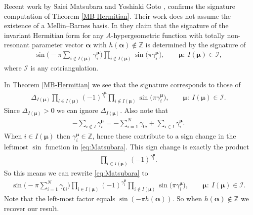 \documentclass[pdftex]{sigma}
\numberwithin{equation}{section}
\begin{document}
\begin{Remark}
Recent work by Saiei Matsubara and Yoshiaki Goto \cite[Theorem 3.3]{Mat20_2}, \cite[Theorem 2.11]{Mat20} confirms the signature computation of Theorem \ref{MB-Hermitian}.
Their work does not assume
the existence of a Mellin--Barnes basis. In \cite[Theorem 3.3]{Mat20_2} they claim that the signature of the
invariant Hermitian form for any $A$-hypergeometric function with totally non-resonant
parameter vector $\bm\alpha$ with $h(\bm{\alpha})\not\in\mathbb{Z}$
is determined by the signature of
\begin{gather}
\sin\Bigg({-}\pi \sum_{i \not \in I(\bm\mu)}\gamma^{\bm\mu}_i\Bigg)\prod_{i \not \in I(\bm\mu)}\sin\big(\pi \gamma^{\bm\mu}_i\big),\qquad\bm\mu\colon\ I(\bm\mu) \in \mathcal{I},
\label{eq:Matsubara}
\end{gather}
where $\mathcal{I}$ is any cotriangulation.

In Theorem \ref{MB-Hermitian}
we see that the signature corresponds to those of
\begin{gather*}
\Delta_{I(\bm\mu)} \prod_{l \in I(\bm\mu)} (-1)^{\gamma_l^{\bm\mu}}\prod_{i \not \in I(\bm\mu)} \sin\big(\pi \gamma_i^{\bm\mu}\big),\qquad \bm\mu\colon\ I(\bm\mu) \in \mathcal{I}.
\end{gather*}
Since $\Delta_{I(\bm\mu)}>0$ we can ignore $\Delta_{I(\bm\mu)}$.
Also note that
\begin{gather*}
-\sum_{i \not \in I}\gamma^{\bm\mu}_i = -\sum_{i=1}^N \gamma_{0i} + \sum_{i \in I}\gamma^{\bm\mu}_i.
\end{gather*}
When $i \in I(\bm\mu)$ then $\gamma^{\bm\mu}_i \in \mathbb{Z}$, hence these contribute to a sign change in the leftmost $\sin$ function in \eqref{eq:Matsubara}. This sign change is exactly the product
\begin{gather*}
\prod_{l \in I(\bm\mu)} (-1)^{\gamma_l^{\bm\mu}}.
\end{gather*}
So this means we can rewrite \eqref{eq:Matsubara} to
\begin{gather*}
\sin\Bigg({-}\pi \sum_{i=1}^N\gamma_{0i}\Bigg)\prod_{l \in I(\bm\mu)} (-1)^{\gamma_l^{\bm\mu}}
\prod_{i \not \in I(\bm\mu)}\sin\big(\pi \gamma^{\bm\mu}_i\big),\qquad \bm\mu\colon\ I(\bm\mu) \in \mathcal{I}.
\end{gather*}
Note that the left-most factor equals $\sin(-\pi h(\bm\alpha))$. So when
$h(\bm\alpha)\not\in\mathbb{Z}$ we recover our result.
\end{Remark}
\end{document}
